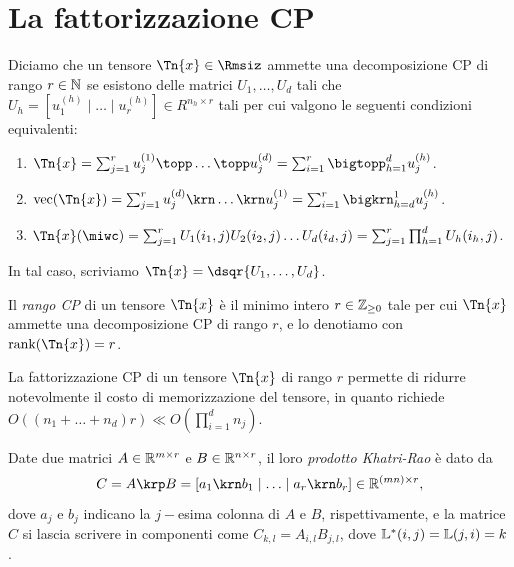 \section{La fattorizzazione CP}
\begin{definition}
\label{def:CP}
  Diciamo che un tensore $ \Tn{x} \in \Rmsiz $ ammette una decomposizione CP di rango $ r\in \mathbb{N} $ se
  esistono delle matrici $ U_1, \ldots, U_d $ tali che $ U_h = \left[ u_1^{(h)} \mid \ldots \mid u_r^{(h)}\right]\in R^{n_h \times r} $ tali per cui
  valgono le seguenti condizioni equivalenti:
  \begin{enumerate}[label=(\roman*)]
    \item $ \Tn{x} = \sum_{j=1}^r u_j^{(1)} \topp \ldots \topp u_j^{(d)} = \sum_{i=1}^r
      \bigtopp_{h=1}^d u_j^{(h)}$.
    \item $ \vec(\Tn{x}) = \sum_{j=1}^r u_j^{(d)} \krn \ldots \krn u_j^{(1)} = \sum_{i=1}^r
      \bigkrn_{h=d}^1 u_j^{(h)}$.
    \item $\Tn{x}(\miwc) = \sum_{j=1}^r U_1(i_1,j)U_2(i_2,j)\ldots U_d(i_d,j) = \sum_{j=1}^r
      \prod_{h=1}^d U_h(i_h,j)$.
  \end{enumerate}
  In tal caso, scriviamo $ \Tn{x} = \dsqr{U_1, \ldots, U_d} $.
\end{definition}



\begin{definition}
Il \emph{rango CP} di un tensore $ \Tn{x} $ è il minimo intero $ r \in \mathbb{Z}_{\ge 0} $ tale per cui $
\Tn{x} $ ammette una decomposizione CP di rango $ r $, e lo denotiamo con $ \rk(\Tn{x}) = r$.
\end{definition}

\begin{remark}
  La fattorizzazione CP di un tensore $ \Tn{x} $ di rango $ r $ permette di ridurre notevolmente il
  costo di memorizzazione del tensore, in quanto richiede $ O((n_1 + \ldots + n_d)r) \ll
  O(\prod_{i=1}^d n_j)$.
\end{remark}


\begin{definition}
  Date due matrici $ A \in \mathbb{R}^{m \times r} $ e $ B \in \mathbb{R}^{n \times r} $, il loro \emph{prodotto
  Khatri-Rao} è dato da
  \begin{equation}
    C = A \krp B = \left[ a_1 \krn b_1 \mid \ldots \mid a_r \krn b_r \right] \in \R^{(mn) \times r},
  \end{equation}
  dove $ a_j $ e $ b_j $ indicano la $ j-$esima colonna di $ A $ e $ B $, rispettivamente, e la matrice $ C $
  si lascia scrivere in componenti come $ C_{k,l} = A_{i,l}B_{j,l} $, dove $ \mathbb{L}^*(i,j) = \mathbb{L}(j,i) = k $.
\end{definition}

